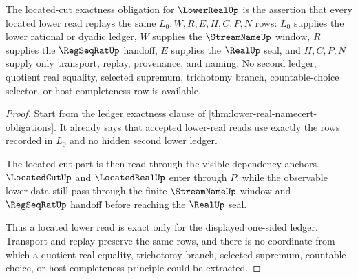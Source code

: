 \begin{theorem}
\label{thm:lowerreal-located-cut-ledger}
The located-cut exactness obligation for $\LowerRealUp$ is the assertion that every located lower read replays the same $L_0,W,R,E,H,C,P,N$ rows: $L_0$ supplies the lower rational or dyadic ledger, $W$ supplies the $\StreamNameUp$ window, $R$ supplies the $\RegSeqRatUp$ handoff, $E$ supplies the $\RealUp$ seal, and $H,C,P,N$ supply only transport, replay, provenance, and naming. No second ledger, quotient real equality, selected supremum, trichotomy branch, countable-choice selector, or host-completeness row is available.
\end{theorem}
\begin{proof}
Start from the ledger exactness clause of \autoref{thm:lower-real-namecert-obligations}. It already says that accepted lower-real reads use exactly the rows recorded in $L_0$ and no hidden second lower ledger.

The located-cut part is then read through the visible dependency anchors. $\LocatedCutUp$ and $\LocatedRealUp$ enter through $P$, while the observable lower data still pass through the finite $\StreamNameUp$ window and $\RegSeqRatUp$ handoff before reaching the $\RealUp$ seal.

Thus a located lower read is exact only for the displayed one-sided ledger. Transport and replay preserve the same rows, and there is no coordinate from which a quotient real equality, trichotomy branch, selected supremum, countable choice, or host-completeness principle could be extracted.
\end{proof}

